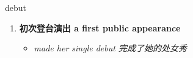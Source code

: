 
\begin{frame}
{\huge debut}
\begin{center}
\begin{enumerate}\Large
  \item \textbf{初次登台演出 a first public appearance}
  \begin{itemize}
    \item \em{\Large{made her single debut 完成了她的处女秀}}
  \end{itemize}
\end{enumerate}
\end{center}
\end{frame}
